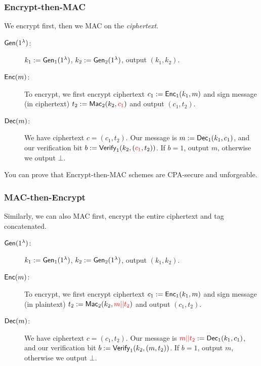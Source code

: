 \subsubsection{Encrypt-then-MAC}
We encrypt first, then we MAC on the \emph{ciphertext}.


\begin{description}
    \item[$\operatorname{\mathsf{Gen}}(1^\lambda)$:] $k_1:=\operatorname{\mathsf{Gen}}_1(1^\lambda)$, $k_2:=\operatorname{\mathsf{Gen}}_2(1^\lambda)$, output $(k_1, k_2)$.

    \item[$\operatorname{\mathsf{Enc}}(m)$:] To encrypt, we first encrypt ciphertext $c_1 := \operatorname{\mathsf{Enc}}_1(k_1, m)$ and sign message (in ciphertext) $t_2 := \operatorname{\mathsf{Mac}}_2(k_2, {\color{red} c_1})$ and output $(c_1, t_2)$.

    \item[$\operatorname{\mathsf{Dec}}(m)$:] We have ciphertext $c = (c_1, t_2)$. Our message is $m:=\operatorname{\mathsf{Dec}}_1(k_1, c_1)$, and our verification bit $b := \operatorname{\mathsf{Verify}}_1(k_2, ({\color{red} c_1}, t_2))$. If $b = 1$, output $m$, otherwise we output $\bot$.
\end{description}

You can prove that Encrypt-then-MAC schemes are CPA-secure and unforgeable.

\subsubsection{MAC-then-Encrypt}
Similarly, we can also MAC first, encrypt the entire ciphertext and tag concatenated.


\begin{description}
    \item[$\operatorname{\mathsf{Gen}}(1^\lambda)$:] $k_1:=\operatorname{\mathsf{Gen}}_1(1^\lambda)$, $k_2:=\operatorname{\mathsf{Gen}}_2(1^\lambda)$, output $(k_1, k_2)$.

    \item[$\operatorname{\mathsf{Enc}}(m)$:] To encrypt, we first encrypt ciphertext $c_1 := \operatorname{\mathsf{Enc}}_1(k_1, m)$ and sign message (in plaintext) $t_2 := \operatorname{\mathsf{Mac}}_2(k_2, {\color{red} m||t_2})$ and output $(c_1, t_2)$.

    \item[$\operatorname{\mathsf{Dec}}(m)$:] We have ciphertext $c = (c_1, t_2)$. Our message is ${\color{red} m||t_2}:=\operatorname{\mathsf{Dec}}_1(k_1, c_1)$, and our verification bit $b := \operatorname{\mathsf{Verify}}_1(k_2, (m, t_2))$. If $b = 1$, output $m$, otherwise we output $\bot$.
\end{description}

